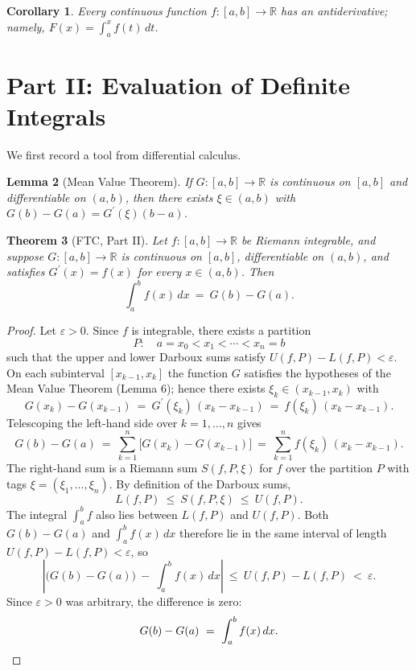\documentclass{article}
\newtheorem{theorem}{Theorem}[section]
\newtheorem{lemma}[theorem]{Lemma}
\newtheorem{corollary}[theorem]{Corollary}
\theoremstyle{definition}
\begin{document}
\begin{corollary}
Every continuous function $f\colon[a,b]\to\mathbb{R}$ has an antiderivative; namely, $F(x)=\int_{a}^{x}f(t)\,dt$.
\end{corollary}

\section{Part II: Evaluation of Definite Integrals}

We first record a tool from differential calculus.

\begin{lemma}[Mean Value Theorem]
If $G\colon[a,b]\to\mathbb{R}$ is continuous on $[a,b]$ and differentiable on $(a,b)$, then there exists $\xi\in(a,b)$ with $G(b)-G(a)=G^{\prime}(\xi)(b-a)$.
\end{lemma}

\begin{theorem}[FTC, Part II]
Let $f\colon[a,b]\to\mathbb{R}$ be Riemann integrable, and suppose $G\colon[a,b]\to\mathbb{R}$ is continuous on $[a,b]$, differentiable on $(a,b)$, and satisfies $G^{\prime}(x)=f(x)$ for every $x\in(a,b)$. Then
$$\int_{a}^{b}f(x)\,dx\ =\ G(b)-G(a).$$
\end{theorem}

\begin{proof}
Let $\varepsilon>0$. Since $f$ is integrable, there exists a partition
$$P\colon\quad a=x_{0}<x_{1}<\cdots<x_{n}=b$$
such that the upper and lower Darboux sums satisfy $U(f,P)-L(f,P)<\varepsilon$. On each subinterval $[x_{k-1},x_{k}]$ the function $G$ satisfies the hypotheses of the Mean Value Theorem (Lemma 6); hence there exists $\xi_{k}\in(x_{k-1},x_{k})$ with
$$G(x_{k})-G(x_{k-1})\ =\ G^{\prime}(\xi_{k})\,(x_{k}-x_{k-1})\ =\ f(\xi_{k})\,(x_{k}-x_{k-1}).$$
Telescoping the left-hand side over $k=1,\ldots,n$ gives
$$G(b)-G(a)\ =\ \sum_{k=1}^{n}\bigl[G(x_{k})-G(x_{k-1})\bigr]\ =\ \sum_{k=1}^{n}f(\xi_{k})\,(x_{k}-x_{k-1}).$$
The right-hand sum is a Riemann sum $S(f,P,\xi)$ for $f$ over the partition $P$ with tags $\xi=(\xi_{1},\ldots,\xi_{n})$. By definition of the Darboux sums,
$$L(f,P)\ \leq\ S(f,P,\xi)\ \leq\ U(f,P).$$
The integral $\int_{a}^{b}f$ also lies between $L(f,P)$ and $U(f,P)$. Both $G(b)-G(a)$ and $\int_{a}^{b}f(x)\,dx$ therefore lie in the same interval of length $U(f,P)-L(f,P)<\varepsilon$, so
$$\left|\bigl(G(b)-G(a)\bigr)\ -\ \int_{a}^{b}f(x)\,dx\right|\ \leq\ U(f,P)-L(f,P)\ <\ \varepsilon.$$
Since $\varepsilon>0$ was arbitrary, the difference is zero:
$$G(b)-G(a)\ =\ \int_{a}^{b}f(x)\,dx.\qedhere$$
\end{proof}
\end{document}
